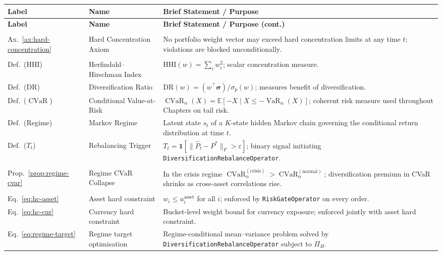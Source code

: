 \documentclass[12pt,openany]{book}
\newcommand{\E}{\mathbb{E}}
\newcommand{\bfw}{\mathbf{w}}
\DeclareMathOperator{\CVaR}{CVaR}
\DeclareMathOperator{\VaR}{VaR}
\numberwithin{equation}{chapter}
\theoremstyle{plain}
\theoremstyle{definition}
\theoremstyle{remark}
\def\bfw{w}%
\begin{document}
{\small
\begin{longtable}{@{} p{2.4cm} p{5.2cm} p{\dimexpr\textwidth-2.4cm-5.2cm-4\tabcolsep\relax} @{}}
\hline
\textbf{Label} & \textbf{Name} & \textbf{Brief Statement / Purpose} \\
\hline
\endfirsthead
\hline
\textbf{Label} & \textbf{Name} & \textbf{Brief Statement / Purpose (cont.)} \\
\hline
\endhead
\endfoot
\multicolumn{3}{@{}l}{\textit{Axioms}} \\[2pt]
Ax.~\ref{ax:hard-concentration} & Hard Concentration Axiom &
  No portfolio weight vector may exceed hard concentration limits at
  any time $t$; violations are blocked unconditionally. \\
\addlinespace
\multicolumn{3}{@{}l}{\textit{Definitions (selected)}} \\[2pt]
Def.\ (HHI) & Herfindahl--Hirschman Index &
  $\mathrm{HHI}(\bfw) = \sum_i w_i^2$; scalar concentration measure. \\
\addlinespace
Def.\ (DR) & Diversification Ratio &
  $\mathrm{DR}(\bfw) = (\bfw^\top\boldsymbol{\sigma})/\sigma_p(\bfw)$;
  measures benefit of diversification. \\
\addlinespace
Def.\ ($\CVaR$) & Conditional Value-at-Risk &
  $\CVaR_\alpha(X) = \E[-X \mid X \le -\VaR_\alpha(X)]$; coherent
  risk measure used throughout Chapters on tail risk. \\
\addlinespace
Def.\ (Regime) & Markov Regime &
  Latent state $s_t$ of a $K$-state hidden Markov chain governing the
  conditional return distribution at time $t$. \\
\addlinespace
Def.\ ($T_t$) & Rebalancing Trigger &
  $T_t = \mathbf{1}[\|\hat{P}_t - P^*\|_F > \varepsilon]$; binary
  signal initiating \texttt{DiversificationRebalanceOperator}. \\
\addlinespace
\multicolumn{3}{@{}l}{\textit{Propositions}} \\[2pt]
Prop.~\ref{prop:regime-cvar} & Regime CVaR Collapse &
  In the crisis regime $\CVaR_\alpha^{(\mathrm{crisis})} >
  \CVaR_\alpha^{(\mathrm{normal})}$; diversification premium in CVaR
  shrinks as cross-asset correlations rise. \\
\addlinespace
\multicolumn{3}{@{}l}{\textit{Equations (key)}} \\[2pt]
Eq.~\eqref{eq:hc-asset} & Asset hard constraint &
  $w_i \le u_i^{\mathrm{asset}}$ for all $i$; enforced by
  \texttt{RiskGateOperator} on every order. \\
\addlinespace
Eq.~\eqref{eq:hc-cur} & Currency hard constraint &
  Bucket-level weight bound for currency exposure; enforced jointly
  with asset hard constraint. \\
\addlinespace
Eq.~\eqref{eq:regime-target} & Regime target optimisation &
  Regime-conditional mean--variance problem solved by
  \texttt{DiversificationRebalanceOperator} subject to $\Pi_H$. \\
\hline
\end{longtable}
}
\end{document}
